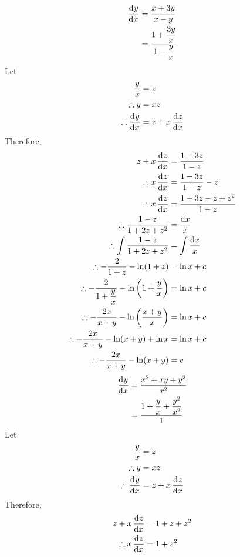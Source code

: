 \documentclass[fleqn, a4paper, 12pt, oneside]{amsart}
\theoremstyle{definition}
\theoremstyle{theorem}
\begin{document}
\begin{solution}
	\begin{tasks}
		\task
			\begin{align*}
				\dod{y}{x} &= \dfrac{x + 3y}{x - y}\\
				&= \dfrac{1 + \dfrac{3y}{x}}{1 - \dfrac{y}{x}}
			\end{align*}
			Let
			\begin{align*}
				\dfrac{y}{x} &= z\\
				\therefore y &= x z\\
				\therefore \dod{y}{x} &= z + x \dod{z}{x}
			\end{align*}
			Therefore,
			\begin{align*}
				z + x \dod{z}{x} &= \dfrac{1 + 3z}{1 - z}\\
				\therefore x \dod{z}{x} &= \dfrac{1 + 3z}{1 - z} - z\\
				\therefore x \dod{z}{x} &= \dfrac{1 + 3z - z + z^2}{1 - z}\\
				\therefore \dfrac{1 - z}{1 + 2z + z^2} &= \dfrac{\dif x}{x}\\
				\therefore \int \dfrac{1 - z}{1 + 2z + z^2} &= \int \dfrac{\dif x}{x}\\
				\therefore -\dfrac{2}{1 + z} - \ln (1 + z) &= \ln x + c\\
				\therefore -\dfrac{2}{1 + \dfrac{y}{x}} - \ln \left( 1 + \dfrac{y}{x} \right) &= \ln x + c\\
				\therefore -\dfrac{2x}{x + y} - \ln \left( \dfrac{x + y}{x} \right) &= \ln x + c\\
				\therefore -\dfrac{2x}{x + y} - \ln (x + y) + \ln x &= \ln x + c\\
				\therefore -\dfrac{2x}{x + y} - \ln (x + y) &= c
			\end{align*}
		\task
			\begin{align*}
				\dod{y}{x} &= \dfrac{x^2 + xy + y^2}{x^2}\\
				&= \dfrac{1 + \dfrac{y}{x} + \dfrac{y^2}{x^2}}{1}
			\end{align*}
			Let
			\begin{align*}
				\dfrac{y}{x} &= z\\
				\therefore y &= x z\\
				\therefore \dod{y}{x} &= z + x \dod{z}{x}
			\end{align*}
			Therefore,
			\begin{align*}
				z + x \dod{z}{x} &= 1 + z + z^2\\
				\therefore x \dod{z}{x} &= 1 + z^2\\

\end{align*}
\end{tasks}
\end{solution}
\end{document}
